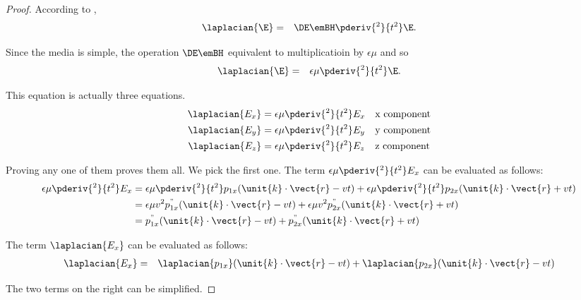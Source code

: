 \begin{proof}
According to ,
\begin{eqnarray}
   \laplacian{\E} &=& \DE \emBH \pderiv{^2}{t^2}\E .
\end{eqnarray}

Since the media is simple, the operation $\DE \emBH$ equivalent to multiplicatioin by $\epsilon\mu$ and so
\begin{align*}
   \laplacian{\E} &=& \epsilon\mu \pderiv{^2}{t^2}\E.
\end{align*}

This equation is actually three equations.
\begin{align*}
   \laplacian{E_x} &= \epsilon\mu \pderiv{^2}{t^2}E_x  && \text{x component} \\
   \laplacian{E_y} &= \epsilon\mu \pderiv{^2}{t^2}E_y  && \text{y component} \\
   \laplacian{E_z} &= \epsilon\mu \pderiv{^2}{t^2}E_z  && \text{z component}
\end{align*}

Proving any one of them proves them all.  We pick the first one.
The term $\epsilon\mu\pderiv{^2}{t^2}E_x$ can be evaluated as follows:
\begin{align*}
   \epsilon\mu\pderiv{^2}{t^2}E_x
   &= 
   \epsilon\mu\pderiv{^2}{t^2}p_{1x}(\unit{k}\cdot \vect{r} - vt) +
   \epsilon\mu\pderiv{^2}{t^2}p_{2x}(\unit{k}\cdot \vect{r} + vt)
   \\&= 
   \epsilon\mu v^2 p^"_{1x}(\unit{k}\cdot \vect{r} - vt) +
   \epsilon\mu v^2 p^"_{2x}(\unit{k}\cdot \vect{r} + vt)
   \\&= 
   p^"_{1x}(\unit{k}\cdot \vect{r} - vt) +
   p^"_{2x}(\unit{k}\cdot \vect{r} + vt)
\end{align*}

The term $\laplacian{E_x}$ can be evaluated as follows:
\begin{align*}
   \laplacian{E_x}
   &=&
   \laplacian{p_{1x}}(\unit{k}\cdot \vect{r} - vt) +
   \laplacian{p_{2x}}(\unit{k}\cdot \vect{r} - vt)
\end{align*}

The two terms on the right can be simplified.


\end{proof}
